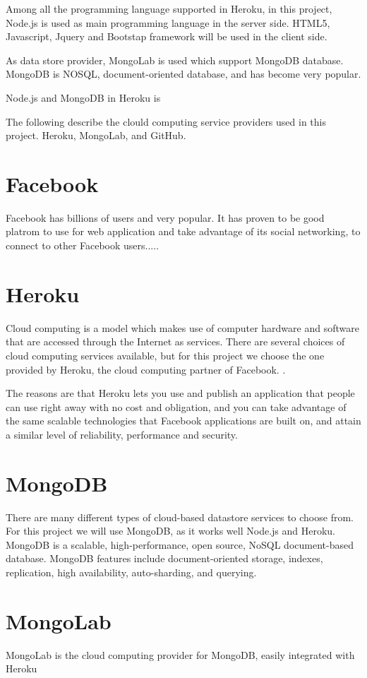 Among all the programming language supported in Heroku, in this project, Node.js is used as main programming language in the server side. HTML5, Javascript, Jquery and Bootstap framework will be used in the client side. 

As data store provider, MongoLab is used which support MongoDB database. MongoDB is NOSQL, document-oriented database, and has become very popular.   

Node.js and MongoDB in Heroku is     

The following describe the clould computing service providers used in this project. Heroku, MongoLab, and GitHub.

\section{Facebook}
Facebook has billions of users and very popular. It has proven to be good platrom to use for web application and take advantage of its social networking, to connect to other Facebook users..... 

\section{Heroku}
Cloud computing is a model which makes use of computer hardware and software that are accessed through the Internet as services. There are several choices of cloud computing services available, but for this project we choose the one provided by Heroku, the cloud computing partner of Facebook. \cite{Heroku}.

The reasons are that Heroku lets you use and publish an application that people can use right away with no cost and obligation, and you can take advantage of the same scalable technologies that Facebook applications are built on, and attain a similar level of reliability, performance and security. 

\section{MongoDB}
There are many different types of cloud-based datastore services to choose from. For this project we will use MongoDB, as it works well Node.js and Heroku. MongoDB is a scalable, high-performance, open source, NoSQL document-based database. MongoDB features include document-oriented storage, indexes, replication, high availability, auto-sharding, and querying.

\section{MongoLab}
MongoLab is the cloud computing provider for MongoDB, easily integrated with Heroku

